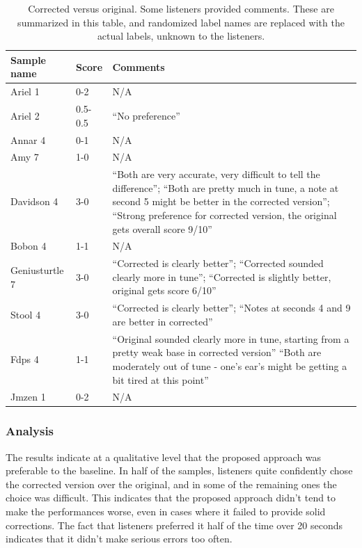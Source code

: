 \begin{table}
  \begin{center}
    
    \label{tab:original-scores}
    \begin{tabularx}{\columnwidth}{|l|l|X|}
    \hline
\textbf{Sample name} & \textbf{Score} & \textbf{Comments} \\
\hline\hline
Ariel 1 & 0-2 & N/A \\
\hline
Ariel 2 & 0.5-0.5 & ``No preference'' \\ 
\hline
Annar 4 & 0-1 & N/A \\ 
\hline
Amy 7 & 1-0 & N/A \\
\hline
Davidson 4 & 3-0 & ``Both are very accurate, very difficult to tell the difference''; ``Both are pretty much in tune, a note at second 5 might be better in the corrected version''; ``Strong preference for corrected version, the original gets overall score 9/10''\\ 
\hline
Bobon 4 & 1-1 & N/A \\ 
\hline
Geniusturtle 7 & 3-0 & ``Corrected is clearly better''; ``Corrected sounded clearly more in tune''; ``Corrected is slightly better, original gets score 6/10''\\ 
\hline
Stool 4 & 3-0 & ``Corrected is clearly better''; ``Notes at seconds 4 and 9 are better in corrected'' \\ 
\hline
Fdps 4 & 1-1 & ``Original sounded clearly more in tune, starting from a pretty weak base in corrected version'' ``Both are moderately out of tune - one's ear's might be getting a bit tired at this point'' \\ 
\hline
Jmzen 1 & 0-2 & N/A \\ 
\hline
    \end{tabularx}
    \caption{Corrected versus original. Some listeners provided comments. These are summarized in this table, and randomized label names are replaced with the actual labels, unknown to the listeners.}
  \end{center}
\end{table}

\subsubsection{Analysis}
The results indicate at a qualitative level that the proposed approach was preferable to the baseline. In half of the samples, listeners quite confidently chose the corrected version over the original, and in some of the remaining ones the choice was difficult. This indicates that the proposed approach didn't tend to make the performances worse, even in cases where it failed to provide solid corrections. The fact that listeners preferred it half of the time over 20 seconds indicates that it didn't make serious errors too often.

